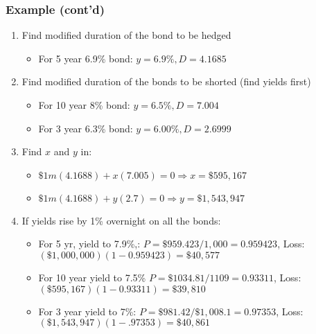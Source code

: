 \documentclass[10pt]{beamer}
\begin{document}
\begin{frame}
	\frametitle{Example (cont'd)}
	
	\begin{enumerate} \itemsep10pt
		\item Find modified duration of the bond to be hedged
		\begin{itemize}
			\item For 5 year 6.9\% bond: $y = 6.9\%, D=4.1685$
		\end{itemize}
		
		\item Find modified duration of the bonds to be shorted (find yields first)
		\begin{itemize}
			\item For 10 year 8\% bond: $y=6.5\%, D=7.004$
			\item For 3 year 6.3\% bond: $y = 6.00\%, D = 2.6999$
		\end{itemize}
		
		\item Find $x$ and $y$ in:
		
		\begin{itemize}
			\item $\$1m(4.1688)+x(7.005)=0  \Rightarrow x =\$595,167 $
			\item $\$1m(4.1688)+y(2.7)=0 \Rightarrow y = \$1,543,947 $
		\end{itemize}
		
		\item If yields rise by 1\% overnight on all the bonds:
		\begin{itemize}
			\item For 5 yr, yield to 7.9\%,: $P=\$959.423/1,000=0.959423$, Loss: $(\$1,000,000)(1-0.959423) = \$40,577 $
			\item For 10 year yield to 7.5\% $P=\$1034.81/1109=0.93311$, Loss: $(\$595,167)(1-0.93311) = \$39,810$
			\item For 3 year yield to 7\%: $P=\$981.42/\$1,008.1=0.97353$, Loss: $(\$1,543,947)(1-.97353) = \$40,861 $
		\end{itemize}
		
	\end{enumerate}
	
\end{frame}
\end{document}
